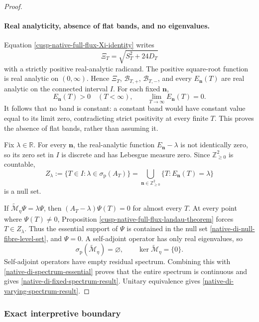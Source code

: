 \begin{proof}
\paragraph{Real analyticity, absence of flat bands, and no eigenvalues.}
Equation \eqref{cusp-native-full-flux-Xi-identity} writes
\[
 \Xi_T=\sqrt{S_T^2+24D_T}
\]
with a strictly positive real-analytic radicand.  The positive square-root
function is real analytic on \((0,\infty)\).  Hence
\(\Xi_T\), \(\mathcal B_{T,+}\), \(\mathcal B_{T,-}\), and every
\(E_{\mathbf n}(T)\) are real analytic on the connected interval \(I\).
For each fixed \(\mathbf n\),
\[
 E_{\mathbf n}(T)>0\quad(T<\infty),
 \qquad
 \lim_{T\to\infty}E_{\mathbf n}(T)=0.
\]
It follows that no band is constant: a constant band would have constant
value equal to its limit zero, contradicting strict positivity at every
finite \(T\).  This proves the absence of flat bands, rather than assuming
it.

Fix \(\lambda\in\mathbb R\).  For every \(\mathbf n\), the real-analytic
function \(E_{\mathbf n}-\lambda\) is not identically zero, so its zero set
in \(I\) is discrete and has Lebesgue measure zero.  Since
\(\mathbb Z_{\ge0}^2\) is countable,
\begin{equation}
 Z_\lambda
 :=\{T\in I:\lambda\in\sigma_{\mathrm p}(A_T)\}
 =\bigcup_{\mathbf n\in\mathbb Z_{\ge0}^2}
   \{T:E_{\mathbf n}(T)=\lambda\}
\label{native-di-null-fibre-level-set}
\end{equation}
is a null set.

If
\(\widetilde{\mathscr M}_\eta\Psi=\lambda\Psi\), then
\((A_T-\lambda)\Psi(T)=0\) for almost every \(T\).  At every point where
\(\Psi(T)\ne0\), Proposition
\ref{cusp-native-full-flux-landau-theorem} forces \(T\in Z_\lambda\).
Thus the essential support of \(\Psi\) is contained in the null set
\eqref{native-di-null-fibre-level-set}, and \(\Psi=0\).  A self-adjoint
operator has only real eigenvalues, so
\[
 \sigma_{\mathrm p}(\widetilde{\mathscr M}_\eta)=\varnothing,
 \qquad
 \ker\widetilde{\mathscr M}_\eta=\{0\}.
\]
Self-adjoint operators have empty residual spectrum.  Combining this with
\eqref{native-di-spectrum-essential} proves that the entire spectrum is
continuous and gives \eqref{native-di-fixed-spectrum-result}.  Unitary
equivalence gives \eqref{native-di-varying-spectrum-result}.
\end{proof}

\subsubsection{Exact interpretive boundary}

